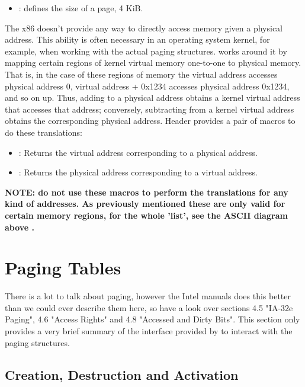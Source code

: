 \begin{appendices}
\begin{itemize}
	\item {}: defines the size of a page, 4 KiB.

\end{itemize}

The x86 doesn't provide any way to directly access memory given a physical address. This ability is
often necessary in an operating system kernel, for example, when working with the actual paging
structures. \projectname works around it by mapping certain regions of kernel virtual memory
one-to-one to physical memory. That is, in the case of these regions of memory the virtual address
 accesses physical address 0, virtual address 
+ 0x1234 accesses physical address 0x1234, and so on up. Thus, adding 
to a physical address obtains a kernel virtual address that accesses that address; conversely,
subtracting  from a kernel virtual address obtains the corresponding
physical address. Header  provides a pair of macros to do these translations:
\begin{itemize}
	\item {}: Returns the virtual address corresponding to a physical address.
	\item {}: Returns the physical address corresponding to a virtual address.
\end{itemize}

\textbf{NOTE: do not use these macros to perform the translations for any kind of addresses. As
previously mentioned these are only valid for certain memory regions, for the whole 'list', see the
ASCII diagram above .}

\section{Paging Tables}
\label{sect:PageTables}

There is a lot to talk about paging, however the Intel manuals does this better than we could ever
describe them here, so have a look over \cite{intelSys} sections 4.5 "IA-32e Paging", 4.6 "Access
Rights" and 4.8 "Accessed and Dirty Bits". This section only provides a very brief summary of the
interface provided by \projectname to interact with the paging structures.

\subsection{Creation, Destruction and Activation}


\end{appendices}

